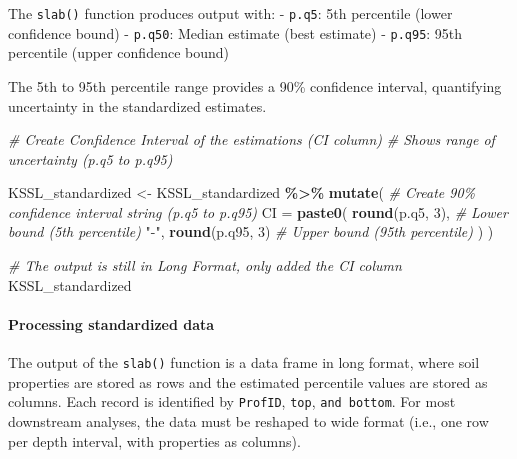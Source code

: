\documentclass[
  10pt,
  b5paper,
  oneside]{book}
\newenvironment{Shaded}{\begin{snugshade}}{\end{snugshade}}
\newcommand{\AttributeTok}[1]{\textcolor[rgb]{0.13,0.29,0.53}{#1}}
\newcommand{\CommentTok}[1]{\textcolor[rgb]{0.56,0.35,0.01}{\textit{#1}}}
\newcommand{\DecValTok}[1]{\textcolor[rgb]{0.00,0.00,0.81}{#1}}
\newcommand{\FunctionTok}[1]{\textcolor[rgb]{0.13,0.29,0.53}{\textbf{#1}}}
\newcommand{\NormalTok}[1]{#1}
\newcommand{\OtherTok}[1]{\textcolor[rgb]{0.56,0.35,0.01}{#1}}
\newcommand{\SpecialCharTok}[1]{\textcolor[rgb]{0.81,0.36,0.00}{\textbf{#1}}}
\newcommand{\StringTok}[1]{\textcolor[rgb]{0.31,0.60,0.02}{#1}}
\begin{document}
The \texttt{slab()} function produces output with: - \texttt{p.q5}: 5th percentile (lower confidence bound) - \texttt{p.q50}: Median estimate (best estimate) - \texttt{p.q95}: 95th percentile (upper confidence bound)

The 5th to 95th percentile range provides a 90\% confidence interval, quantifying uncertainty in the standardized estimates.

\begin{Shaded}
\begin{Highlighting}[]
\CommentTok{\# Create Confidence Interval of the estimations (CI column)}
\CommentTok{\# Shows range of uncertainty (p.q5 to p.q95)}

\NormalTok{KSSL\_standardized }\OtherTok{\textless{}{-}}\NormalTok{ KSSL\_standardized }\SpecialCharTok{\%\textgreater{}\%}
  \FunctionTok{mutate}\NormalTok{(}
    \CommentTok{\# Create 90\% confidence interval string (p.q5 to p.q95)}
    \AttributeTok{CI =} \FunctionTok{paste0}\NormalTok{(}
      \FunctionTok{round}\NormalTok{(p.q5, }\DecValTok{3}\NormalTok{),                 }\CommentTok{\# Lower bound (5th percentile)}
      \StringTok{"{-}"}\NormalTok{,}
      \FunctionTok{round}\NormalTok{(p.q95, }\DecValTok{3}\NormalTok{)                 }\CommentTok{\# Upper bound (95th percentile)}
\NormalTok{    )}
\NormalTok{  )}

\CommentTok{\# The output is still in Long Format, only added the CI column}
\NormalTok{KSSL\_standardized}
\end{Highlighting}
\end{Shaded}

\paragraph*{Processing standardized data}\label{processing-standardized-data}

The output of the \texttt{slab()} function is a data frame in long format, where soil properties are stored as rows and the estimated percentile values are stored as columns. Each record is identified by \texttt{ProfID}, \texttt{top}, \texttt{and\ bottom}. For most downstream analyses, the data must be reshaped to wide format (i.e., one row per depth interval, with properties as columns).
\end{document}
